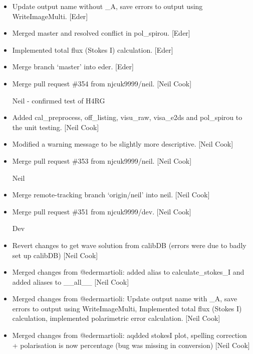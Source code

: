 \documentclass[a4paper,10pt,english]{report}
\begin{document}
\begin{itemize}
\item {} 
Update output name without \_A, save errors to output using
WriteImageMulti. {[}Eder{]}

\item {} 
Merged master and resolved conflict in pol\_spirou. {[}Eder{]}

\item {} 
Implemented total flux (Stokes I) calculation. {[}Eder{]}

\item {} 
Merge branch ‘master’ into eder. {[}Eder{]}

\item {} 
Merge pull request \#354 from njcuk9999/neil. {[}Neil Cook{]}

Neil - confirmed test of H4RG

\item {} 
Added cal\_preprocess, off\_listing, visu\_raw, visa\_e2ds and pol\_spirou
to the unit testing. {[}Neil Cook{]}

\item {} 
Modified a warning message to be slightly more descriptive. {[}Neil
Cook{]}

\item {} 
Merge pull request \#353 from njcuk9999/neil. {[}Neil Cook{]}

Neil

\item {} 
Merge remote-tracking branch ‘origin/neil’ into neil. {[}Neil Cook{]}

\item {} 
Merge pull request \#351 from njcuk9999/dev. {[}Neil Cook{]}

Dev

\item {} 
Revert changes to get wave solution from calibDB (errors were due to
badly set up calibDB) {[}Neil Cook{]}

\item {} 
Merged changes from @edermartioli: added alias to calculate\_stokes\_I
and added aliases to \_\_all\_\_ {[}Neil Cook{]}

\item {} 
Merged changes from @edermartioli: Update output name with \_A, save
errors to output using WriteImageMulti, Implemented total flux (Stokes
I) calculation, implemented polarimetric error calculation. {[}Neil
Cook{]}

\item {} 
Merged changes from @edermartioli: aqdded stokesI plot, spelling
correction + polarisation is now percentage (bug was missing in
conversion) {[}Neil Cook{]}


\end{itemize}
\end{document}
